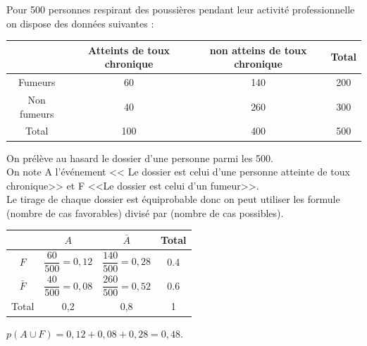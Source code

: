 \documentclass[12pt,a4paper]{article}
\begin{document}
\begin{myex}
	Pour 500 personnes respirant des poussières pendant leur activité professionnelle on dispose des données suivantes :
	
	\begin{small}
		\begin{tabular}{@{\ }c@{\ }|@{\ }c@{\ }|@{\ }c@{\ }|@{\ }c@{\ }|}
			\cline{2-4}
			& Atteints de toux chronique & non atteins de toux chronique & Total \\ \hline
			\multicolumn{1}{|c|}{Fumeurs}     & 60                         & 140                           & 200   \\ \hline
			\multicolumn{1}{|c|}{Non fumeurs} & 40                         & 260                           & 300   \\ \hline
			\multicolumn{1}{|c|}{Total}       & 100                        & 400                           & 500   \\ \hline
		\end{tabular}
	\end{small}
	
	\vspace*{0.5cm}
	
	
	On prélève au hasard le dossier d'une personne parmi les 500.\\
	
	
	On note A l'événement << Le dossier est celui d'une personne atteinte de toux chronique>> et F <<Le dossier est celui d'un fumeur>>.\\
	
	Le tirage de  chaque dossier est équiprobable donc on peut utiliser les formule (nombre de cas favorables) divisé par (nombre de cas possibles).
	
	\begin{small}
		
		\renewcommand{\arraystretch}{2}
		\begin{tabular}{c|c|c|c|}
			\cline{2-4}
			& $A$                      & $\bar{A} $              & Total \\ \hline
			\multicolumn{1}{|c|}{$F$}         & $\dfrac{60}{500}=0,12$ & $\dfrac{140}{500}=0,28$ & 0.4   \\ \hline
			\multicolumn{1}{|c|}{$\bar{F}$} & $\dfrac{40}{500}=0,08$ & $\dfrac{260}{500}=0,52$ & 0.6   \\ \hline
			\multicolumn{1}{|c|}{Total}     & 0,2                    & 0,8                     & 1     \\ \hline
		\end{tabular}
	\end{small}
	
	$p(A \cup F) = 0,12 + 0,08 + 0,28 = 0,48.$
\end{myex}
\end{document}
